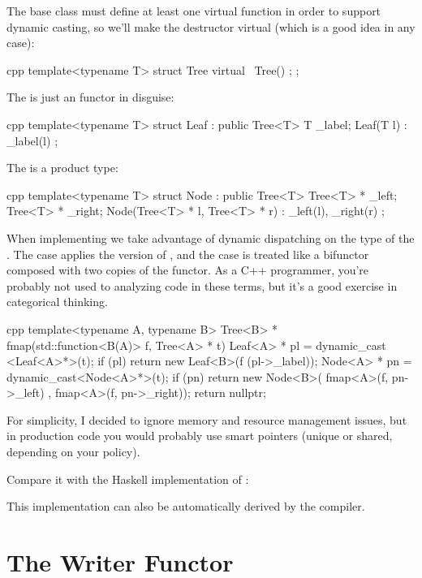 The base class must define at least one virtual function in order to
support dynamic casting, so we'll make the destructor virtual (which is
a good idea in any case):

\begin{snip}{cpp}
template<typename T>
struct Tree {
    virtual ~Tree() {};
};
\end{snip}
The  is just an  functor in disguise:

\begin{snip}{cpp}
template<typename T>
struct Leaf : public Tree<T> {
    T _label;
    Leaf(T l) : _label(l) {}
};
\end{snip}
The  is a product type:

\begin{snip}{cpp}
template<typename T>
struct Node : public Tree<T> {
    Tree<T> * _left;
    Tree<T> * _right;
    Node(Tree<T> * l, Tree<T> * r) : _left(l), _right(r) {}
};
\end{snip}
When implementing  we take advantage of dynamic dispatching
on the type of the . The  case applies the
 version of , and the  case
is treated like a bifunctor composed with two copies of the
 functor. As a C++ programmer, you're probably not used to
analyzing code in these terms, but it's a good exercise in categorical
thinking.

\begin{snip}{cpp}
template<typename A, typename B>
Tree<B> * fmap(std::function<B(A)> f, Tree<A> * t) {
    Leaf<A> * pl = dynamic_cast <Leaf<A>*>(t);
    if (pl)
        return new Leaf<B>(f (pl->_label));
    Node<A> * pn = dynamic_cast<Node<A>*>(t);
    if (pn)
        return new Node<B>( fmap<A>(f, pn->_left)
                          , fmap<A>(f, pn->_right));
    return nullptr;
}
\end{snip}
For simplicity, I decided to ignore memory and resource management
issues, but in production code you would probably use smart pointers
(unique or shared, depending on your policy).

Compare it with the Haskell implementation of :

This implementation can also be automatically derived by the compiler.

\section{The Writer Functor}

